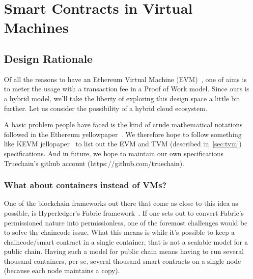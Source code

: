 \section{Smart Contracts in Virtual Machines}

\subsection{Design Rationale}

Of all the reasons to have an Ethereum Virtual Machine (EVM)~\cite{gavinethereum}, one of aims is to meter the usage with a transaction fee
in a Proof of Work model. Since ours is a hybrid model, we'll take the liberty of exploring this design space a little bit further. Let us
consider the possibility of a hybrid cloud ecosystem.

A basic problem people have faced is the kind of crude mathematical notations followed in the Ethereum yellowpaper~\cite{gavinethereum}.
We therefore hope to follow something like KEVM jellopaper~\cite{kevmjello} to list out the EVM and TVM (described in~\ref{sec:tvm}) specifications.
And in future, we hope to maintain our own specifications Truechain's github account (https://github.com/truechain). 

\subsubsection{What about containers instead of VMs?}

One of the blockchain frameworks out there that come as close to this idea as possible, is Hyperledger's Fabric framework~\cite{fabricpaper}.
If one sets out to convert Fabric's permissioned nature into permissionless, one of the foremost challenges
would be to solve the chaincode issue. What this means is while it's possible to keep a chaincode/smart contract in a single container,
that is not a scalable model for a public chain. Having such a model for public chain means having to run several thousand containers,
per se, several thousand smart contracts on a single node (because each node maintains a copy).

